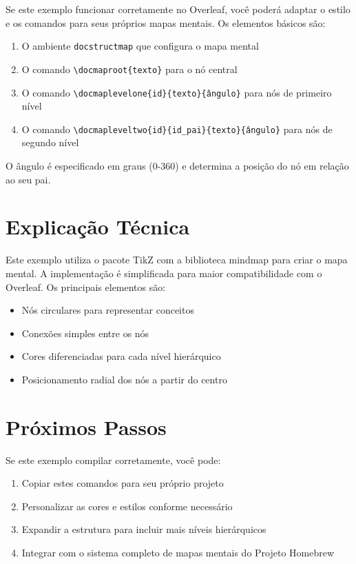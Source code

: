 \documentclass[12pt, a4paper]{article}
\begin{document}
Se este exemplo funcionar corretamente no Overleaf, você poderá adaptar o estilo e os comandos para seus próprios mapas mentais. Os elementos básicos são:

\begin{enumerate}
    \item O ambiente \texttt{docstructmap} que configura o mapa mental
    \item O comando \texttt{\textbackslash docmaproot\{texto\}} para o nó central
    \item O comando \texttt{\textbackslash docmaplevelone\{id\}\{texto\}\{ângulo\}} para nós de primeiro nível
    \item O comando \texttt{\textbackslash docmapleveltwo\{id\}\{id\_pai\}\{texto\}\{ângulo\}} para nós de segundo nível
\end{enumerate}

O ângulo é especificado em graus (0-360) e determina a posição do nó em relação ao seu pai.

\section{Explicação Técnica}

Este exemplo utiliza o pacote TikZ com a biblioteca mindmap para criar o mapa mental. A implementação é simplificada para maior compatibilidade com o Overleaf. Os principais elementos são:

\begin{itemize}
    \item Nós circulares para representar conceitos
    \item Conexões simples entre os nós
    \item Cores diferenciadas para cada nível hierárquico
    \item Posicionamento radial dos nós a partir do centro
\end{itemize}

\section{Próximos Passos}

Se este exemplo compilar corretamente, você pode:

\begin{enumerate}
    \item Copiar estes comandos para seu próprio projeto
    \item Personalizar as cores e estilos conforme necessário
    \item Expandir a estrutura para incluir mais níveis hierárquicos
    \item Integrar com o sistema completo de mapas mentais do Projeto Homebrew
\end{enumerate}
\end{document}
